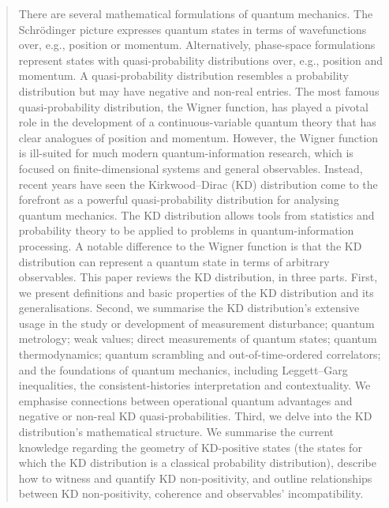 \documentclass[%
 reprint,
superscriptaddress,
nofootinbib,
bibnotes,
 amsmath,amssymb,
 aps,
]{revtex4-1}
\theoremstyle{plain}
\begin{document}
\date{\today}%



\begin{abstract}
There are several mathematical formulations of quantum mechanics. The Schr\"odinger picture expresses 
quantum states in terms of wavefunctions over, e.g., position or momentum.
Alternatively, phase-space formulations represent 
states with quasi-probability distributions over{, e.g.,} position and momentum. 
A quasi-probability distribution resembles 
a probability distribution but may have negative and non-real entries. The most famous quasi-probability distribution, the Wigner function, has played a pivotal role in the development of a continuous-variable quantum theory
that has clear analogues of position and momentum. However, the Wigner function is ill-suited for much modern quantum-information research, which is focused on finite-dimensional systems and general observables.
Instead, recent years have  seen the Kirkwood--Dirac (KD) distribution come to the forefront as a powerful quasi-probability distribution for analysing quantum mechanics. The KD distribution allows tools from statistics and probability theory to be applied to problems in quantum-information processing. A notable  difference to the Wigner function is that the KD distribution can represent a quantum state in terms of arbitrary observables. This  paper reviews the KD distribution, in three parts. First, we present definitions and basic properties of the KD distribution and its generalisations. Second, we summarise the KD distribution’s extensive usage in the study or development of measurement disturbance; quantum metrology; weak values; direct measurements of quantum states; quantum thermodynamics; quantum scrambling and out-of-time-ordered correlators; and the foundations of quantum mechanics, including Leggett--Garg inequalities, the consistent-histories interpretation and contextuality.  We emphasise connections between operational quantum advantages and negative or non-real KD quasi-probabilities.  
Third, we delve into the KD distribution's mathematical structure. We summarise the current knowledge regarding the geometry of KD-positive states (the states for which the KD distribution is a classical probability distribution), describe how to witness and quantify KD non-positivity, and outline relationships between KD non-positivity, coherence and observables’ incompatibility.
\end{abstract}
\end{document}
